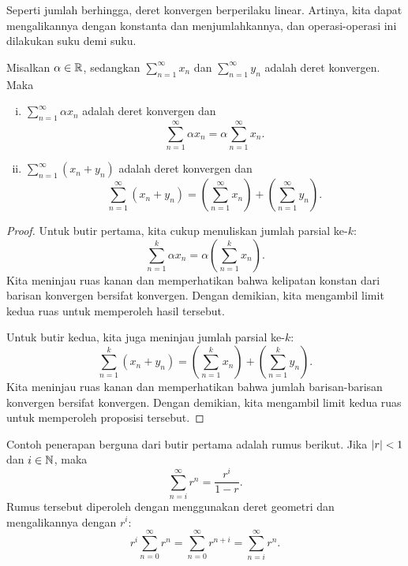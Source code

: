 Seperti jumlah berhingga, deret konvergen berperilaku linear.
Artinya, kita dapat mengalikannya dengan konstanta
dan menjumlahkannya, dan operasi-operasi ini dilakukan suku demi suku.

\begin{prop}
Misalkan $\alpha \in {\mathbb{R}}$, sedangkan $\sum_{n=1}^\infty x_n$ dan $\sum_{n=1}^\infty y_n$ adalah
deret konvergen.  Maka
\begin{enumerate}[(i)]
\item
$\sum_{n=1}^\infty \alpha x_n$ adalah deret konvergen dan
\begin{equation*}
\sum_{n=1}^\infty \alpha x_n
=
\alpha \sum_{n=1}^\infty x_n .
\end{equation*}
\item
$\sum_{n=1}^\infty ( x_n + y_n )$ adalah deret konvergen dan
\begin{equation*}
\sum_{n=1}^\infty ( x_n + y_n ) 
=
\left( \sum_{n=1}^\infty x_n \right)
+
\left( \sum_{n=1}^\infty y_n \right) .
\end{equation*}
\end{enumerate}
\end{prop}

\begin{proof}
Untuk butir pertama,
kita cukup menuliskan jumlah parsial ke-$k$:
\begin{equation*}
\sum_{n=1}^k \alpha x_n
=
\alpha \left( \sum_{n=1}^k x_n \right) .
\end{equation*}
Kita meninjau ruas kanan dan memperhatikan bahwa kelipatan konstan dari
barisan konvergen
bersifat konvergen.  Dengan demikian, kita mengambil limit kedua ruas untuk memperoleh
hasil tersebut.

Untuk butir kedua, kita juga meninjau
jumlah parsial ke-$k$:
\begin{equation*}
\sum_{n=1}^k ( x_n + y_n ) 
=
\left( \sum_{n=1}^k x_n \right)
+
\left( \sum_{n=1}^k y_n \right) .
\end{equation*}
Kita meninjau ruas kanan dan memperhatikan bahwa jumlah barisan-barisan konvergen
bersifat konvergen.  Dengan demikian, kita mengambil limit kedua ruas untuk memperoleh
proposisi tersebut.
\end{proof}

Contoh penerapan berguna dari butir pertama adalah rumus
berikut.  Jika $\lvert {r} \rvert < 1$ dan $i \in {\mathbb{N}}$, maka
\begin{equation*}
\sum_{n=i}^\infty r^n = \frac{r^i}{1-r} .
\end{equation*}
Rumus tersebut diperoleh dengan menggunakan deret geometri dan mengalikannya dengan
$r^i$:
\begin{equation*}
r^i \sum_{n=0}^\infty r^n =
\sum_{n=0}^\infty r^{n+i}
=
\sum_{n=i}^\infty r^n .
\end{equation*}

